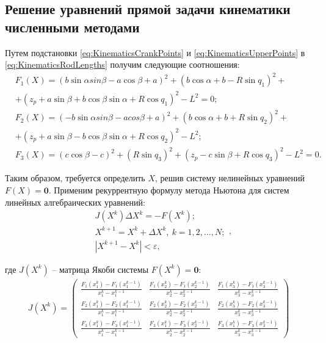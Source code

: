 \subsection{Решение уравнений прямой задачи кинематики численными методами}
Путем подстановки \ref{eq:KinematicsCrankPoints} и \ref{eq:KinematicsUpperPoints} в \ref{eq:KinematicsRodLengths} получим следующие соотношения:
\begin{equation}
\label{eq:DirectKinematicsProblemFormulation}
\begin{aligned}
& F_1\left(X\right)=\left(b\sin{\alpha}sin{\beta}-a\cos{\beta}+a\right)^2+\left(b\cos{\alpha}+b-R\sin{q_1}\right)^2+\\
&+\left(z_p+a\sin{\beta}+b\cos{\beta}\sin{\alpha}+R\cos{q_1}\right)^2-L^2=0;\\
& F_2\left(X\right)=\left(-b\sin{\alpha}sin{\beta}-acos{\beta}+a\right)^2+\left(b\cos{\alpha}+b+R\sin{q_2}\right)^2+\\
&+\left(z_p+a\sin{\beta}-b\cos{\beta}\sin{\alpha}+R\cos{q_2}\right)^2-L^2;\\
& F_3\left(X\right)=\left(c\cos{\beta}-c\right)^2+\left(R\sin{q_3}\right)^2+\left(z_p-c\sin{\beta}+R\cos{q_3}\right)^2-L^2=0.
\end{aligned}
\end{equation}

Таким образом, требуется определить $X$, решив систему нелинейных уравнений $F\left(X\right)=\mathbf{0}$. Применим рекуррентную формулу метода Ньютона для систем линейных алгебраических уравнений:
\begin{equation}
\label{eq:DirectKinematicsNewton}
\begin{aligned}
	& J \left( X^k\right) \Delta X^k = -F\left(X^k\right);\\
	& X^{k+1} = X^k + \Delta X^k,~k=1,2,\dots,N;\\
	& \left|X^{k+1}-X^k\right|<\varepsilon,
\end{aligned},
\end{equation}

где $J\left( X^k\right)$ -- матрица Якоби системы $F\left( X^k\right)=\mathbf{0}$:
\begin{equation}
\label{eq:DirectKinematicsJacobi}
\begin{aligned}
	J\left( X^k\right)=\left(
	\begin{array}{ccc}
		\frac{F_1\left(x_1^k\right)-F_1\left(x_1^{k-1}\right)}{x_1^k-x_1^{k-1}} &
		\frac{F_1\left(x_2^k\right)-F_1\left(x_2^{k-1}\right)}{x_2^k-x_2^{k-1}} &
		\frac{F_1\left(x_3^k\right)-F_1\left(x_3^{k-1}\right)}{x_3^k-x_3^{k-1}} \\
		\frac{F_2\left(x_1^k\right)-F_2\left(x_1^{k-1}\right)}{x_1^k-x_1^{k-1}} &
		\frac{F_2\left(x_2^k\right)-F_2\left(x_2^{k-1}\right)}{x_2^k-x_2^{k-1}} &
		\frac{F_2\left(x_3^k\right)-F_2\left(x_3^{k-1}\right)}{x_3^k-x_3^{k-1}} \\
		\frac{F_3\left(x_1^k\right)-F_3\left(x_1^{k-1}\right)}{x_1^k-x_1^{k-1}} &
		\frac{F_3\left(x_1^k\right)-F_3\left(x_2^{k-1}\right)}{x_2^k-x_2^{k-1}} &
		\frac{F_3\left(x_1^k\right)-F_3\left(x_3^{k-1}\right)}{x_3^k-x_3^{k-1}}
	\end{array}
	\right)
\end{aligned}
\end{equation}
